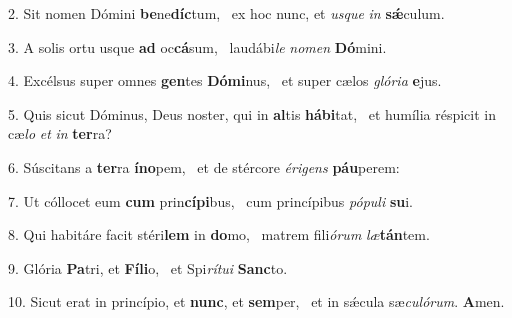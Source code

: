 2. Sit nomen Dómini \textbf{be}ne\textbf{díc}tum, \ast\  ex hoc nunc, et \textit{us}\textit{que} \textit{in} \textbf{sǽ}culum.\

3. A solis ortu usque \textbf{ad} oc\textbf{cá}sum, \ast\  laudábi\textit{le} \textit{no}\textit{men} \textbf{Dó}mini.\

4. Excélsus super omnes \textbf{gen}tes \textbf{Dó}\textbf{mi}nus, \ast\  et super cælos \textit{gló}\textit{ri}\textit{a} \textbf{e}jus.\

5. Quis sicut Dóminus, Deus noster, qui in \textbf{al}tis \textbf{há}\textbf{bi}tat, \ast\  et humília réspicit in cæ\textit{lo} \textit{et} \textit{in} \textbf{ter}ra?\

6. Súscitans a \textbf{ter}ra \textbf{ín}\textbf{o}pem, \ast\  et de stércore \textit{é}\textit{ri}\textit{gens} \textbf{páu}perem:\

7. Ut cóllocet eum \textbf{cum} prin\textbf{cí}\textbf{pi}bus, \ast\  cum princípibus \textit{pó}\textit{pu}\textit{li} \textbf{su}i.\

8. Qui habitáre facit stéri\textbf{lem} in \textbf{do}mo, \ast\  matrem fili\textit{ó}\textit{rum} \textit{læ}\textbf{tán}tem.\

9. Glória \textbf{Pa}tri, et \textbf{Fí}\textbf{li}o, \ast\  et Spi\textit{rí}\textit{tu}\textit{i} \textbf{Sanc}to.\

10. Sicut erat in princípio, et \textbf{nunc}, et \textbf{sem}per, \ast\  et in sǽcula sæ\textit{cu}\textit{ló}\textit{rum}. \textbf{A}men.\


